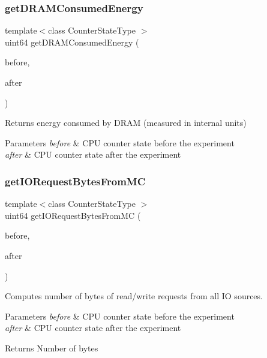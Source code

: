 \subsubsection{get\+D\+R\+A\+M\+Consumed\+Energy}
{\footnotesize\ttfamily template$<$class Counter\+State\+Type $>$ \\
uint64 get\+D\+R\+A\+M\+Consumed\+Energy (\begin{DoxyParamCaption}\item[{const Counter\+State\+Type \&}]{before,  }\item[{const Counter\+State\+Type \&}]{after }\end{DoxyParamCaption})\hspace{0.3cm}{\ttfamily [friend]}}



Returns energy consumed by D\+R\+AM (measured in internal units) 


\begin{DoxyParams}{Parameters}
{\em before} & C\+PU counter state before the experiment \\
\hline
{\em after} & C\+PU counter state after the experiment \\
\hline
\end{DoxyParams}
\mbox{\label{classUncoreCounterState_a7e5434dba3a810501f289329e52b889d}} 
\subsubsection{get\+I\+O\+Request\+Bytes\+From\+MC}
{\footnotesize\ttfamily template$<$class Counter\+State\+Type $>$ \\
uint64 get\+I\+O\+Request\+Bytes\+From\+MC (\begin{DoxyParamCaption}\item[{const Counter\+State\+Type \&}]{before,  }\item[{const Counter\+State\+Type \&}]{after }\end{DoxyParamCaption})\hspace{0.3cm}{\ttfamily [friend]}}



Computes number of bytes of read/write requests from all IO sources. 


\begin{DoxyParams}{Parameters}
{\em before} & C\+PU counter state before the experiment \\
\hline
{\em after} & C\+PU counter state after the experiment \\
\hline
\end{DoxyParams}
\begin{DoxyReturn}{Returns}
Number of bytes 
\end{DoxyReturn}
\mbox{\label{classUncoreCounterState_ab7b921e53cadd4e1504c90c400bd8b18}} 
